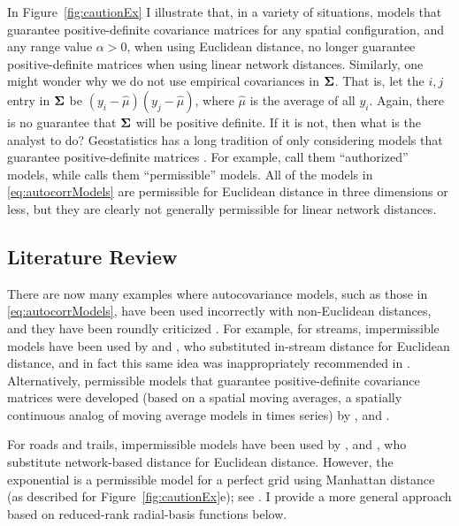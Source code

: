 \documentclass[11pt, titlepage]{article}\usepackage[]{graphicx}\usepackage[]{color}
\begin{document}
\begin{spacing}{1.9}
\begin{flushleft}
In Figure~\ref{fig:cautionEx} I illustrate that, in a variety of situations, models that guarantee positive-definite covariance matrices for any spatial configuration, and any range value $\alpha > 0$, when using Euclidean distance, no longer guarantee positive-definite matrices when using linear network distances. Similarly, one might wonder why we do not use empirical covariances in $\mbox{\boldmath $\Sigma$}$.  That is, let the $i,j$ entry in $\mbox{\boldmath $\Sigma$}$ be $(y_i - \hat{\mu})(y_j - \hat{\mu})$, where $\hat{\mu}$ is the average of all $y_i$.  Again, there is no guarantee that $\mbox{\boldmath $\Sigma$}$ will be positive definite.  If it is not, then what is the analyst to do? Geostatistics has a long tradition of only considering models that guarantee positive-definite matrices \citep[][p. 161]{Jour:Huij:mini:1978}. For example, \citet[][p. 80]{Webs:Oliv:geos:2007} call them ``authorized'' models, while \citet[][p. 87]{Goov:geos:1997} calls them ``permissible'' models.  All of the models in \ref{eq:autocorrModels} are permissible for Euclidean distance in three dimensions or less, but they are clearly not generally permissible for linear network distances.

\subsection*{Literature Review}

There are now many examples where autocovariance models, such as those in \ref{eq:autocorrModels}, have been used incorrectly with non-Euclidean distances, and they have been roundly criticized \citep{Curr:NonE:2006}.  For example, for streams, impermissible models have been used by \citet{Cres:Maju:spat:1997} and \citet{Gard:Sull:Lemb:pred:2003}, who substituted in-stream distance for Euclidean distance, and in fact this same idea was inappropriately recommended in \citet{Okab:Sugi:spat:2012}. Alternatively, permissible models that guarantee positive-definite covariance matrices were developed (based on a spatial moving averages, a spatially continuous analog of moving average models in times series) by \citet{Ver:Pete:Theo:spat:2006}, \citet{Cres:Frey:Harc:Smit:spat:2006} and \citet{Ver:Pete:Move:2010}. 

For roads and trails, impermissible models have been used by \citet{Shio:Shio:stre:2011}, \citet{Selb:Kock:spat:2013} and \citet{Ladl:Avga:Whea:Boyc:pred:2016}, who substitute network-based distance for Euclidean distance.  However, the exponential is a permissible model for a perfect grid using Manhattan distance (as described for Figure~\ref{fig:cautionEx}e); see \citet{Curr:NonE:2006}. I provide a more general approach based on reduced-rank radial-basis functions below. 


\end{flushleft}
\end{spacing}
\end{document}
